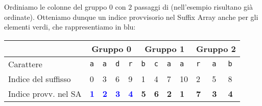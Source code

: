 Ordiniamo le colonne del gruppo \(0\) con \(2\) passaggi di \radixsort
(nell'esempio risultano gi\`a ordinate). Otteniamo dunque un indice provvisorio
nel Suffix Array anche per gli elementi verdi, che rappresentiamo in blu:
\begin{table}[H]
  \begin{tabularx}{\linewidth}{l*{11}{X}}
                        & \multicolumn{4}{c}{Gruppo 0 \cellcolor{green} } 
                        & \multicolumn{4}{c}{Gruppo 1 \cellcolor{red} } 
                        & \multicolumn{3}{c}{Gruppo 2 \cellcolor{yellow} }\\
    \hline
    Carattere           & \texttt{a} & \texttt{a} & \texttt{d} & \texttt{r}
                        & \texttt{b} & \texttt{c} & \texttt{a} & \texttt{a}
                        & \texttt{r} & \texttt{a} & \texttt{b} \\
    Indice del suffisso & 0 & 3 & 6 & 9
                        & 1 & 4 & 7 & 10
                        & 2 & 5 & 8 \\
    Indice provv. nel SA & \textcolor{blue}{\textbf{1}} 
                              & \textcolor{blue}{\textbf{2}} 
                              & \textcolor{blue}{\textbf{3}}
                              & \textcolor{blue}{\textbf{4}}
                        & \textbf{5} & \textbf{6} & \textbf{2} & \textbf{1}
                        & \textbf{7} & \textbf{3} & \textbf{4} \\
  \end{tabularx}
\end{table}

\newpage

